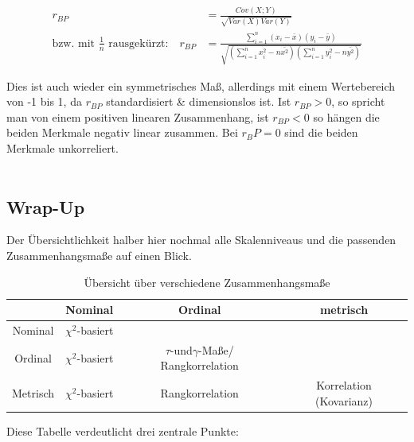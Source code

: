 \documentclass[a4paper]{article}
\begin{document}
\begin{align*}
    r_{BP}&=\frac{Cov(X;Y)}{\sqrt{Var(X)Var(Y)}} \\
    \mbox{bzw. mit $\frac{1}{n}$ rausgekürzt:}\quad
   r_{BP}&=\frac{\sum_{i=1}^n(x_i-\bar{x})(y_i-\bar{y})}{\sqrt{(\sum_{i=1}^nx_i^2-n\bar{x^2})(\sum_{i=1}^ny_i^2-n\bar{y^2})}}
\end{align*}

\noindent Dies ist auch wieder ein symmetrisches Maß, allerdings mit einem Wertebereich von -1 bis 1, da $r_{BP}$ standardisiert \& dimensionslos ist. Ist $r_{BP} > 0$, so spricht man von einem positiven linearen Zusammenhang, ist $r_{BP} < 0$ so hängen die beiden Merkmale negativ linear zusammen. Bei $r_BP = 0$ sind die beiden Merkmale unkorreliert.\\

\noindent {}\\

\subsection{Wrap-Up}

Der Übersichtlichkeit halber hier nochmal alle Skalenniveaus und die passenden Zusammenhangsmaße auf einen Blick.

\begin{table}[htbp]
    \centering
\begin{tabular}{c||c|c|c}
&Nominal & Ordinal & metrisch\\
\hline\hline
Nominal& $\chi^2$-basiert & & \\
Ordinal&$\chi^2$-basiert &$\tau$-und$\gamma$-Maße/ Rangkorrelation& \\
Metrisch &$\chi^2$-basiert & Rangkorrelation & Korrelation (Kovarianz) \\
\end{tabular}
    \caption{Übersicht über verschiedene Zusammenhangsmaße}
    \label{tab:my_label}
\end{table}

\noindent Diese Tabelle verdeutlicht drei zentrale Punkte:
\end{document}
